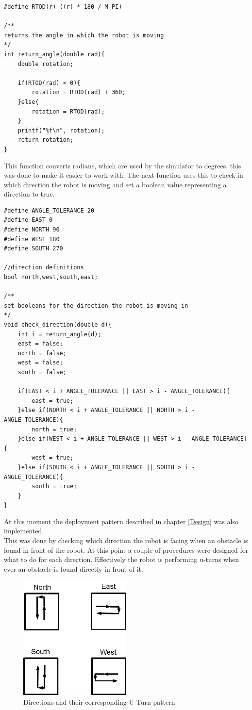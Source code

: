 \begin{flushleft}
\begin{lstlisting}[caption={Converting Radians to degrees}]
#define RTOD(r) ((r) * 180 / M_PI)

/**
returns the angle in which the robot is moving
*/
int return_angle(double rad){
	double rotation;

	if(RTOD(rad) < 0){
		rotation = RTOD(rad) + 360;
	}else{
		rotation = RTOD(rad);
	}
	printf("%f\n", rotation);
	return rotation;
}
\end{lstlisting}

This function converts radians, which are used by the simulator to degrees, this was done to make it easier to work with.
The next function uses this to check in which direction the robot is moving and set a boolean value representing a direction to true.

\begin{lstlisting}[caption={Early check of the movement direction}]
#define ANGLE_TOLERANCE 20
#define EAST 0
#define NORTH 90
#define WEST 180
#define SOUTH 270

//direction definitions
bool north,west,south,east;

/**
set booleans for the direction the robot is moving in
*/
void check_direction(double d){
	int i = return_angle(d);
	east = false;
	north = false;
	west = false;
	south = false;

	if(EAST < i + ANGLE_TOLERANCE || EAST > i - ANGLE_TOLERANCE){
		east = true;
	}else if(NORTH < i + ANGLE_TOLERANCE || NORTH > i - ANGLE_TOLERANCE){
		north = true;
	}else if(WEST < i + ANGLE_TOLERANCE || WEST > i - ANGLE_TOLERANCE){
		west = true;
	}else if(SOUTH < i + ANGLE_TOLERANCE || SOUTH > i - ANGLE_TOLERANCE){
		south = true;
	}
}
\end{lstlisting}

At this moment the deployment pattern described in chapter \ref{Design}  was also implemented. \\
This was done by checking which direction the robot is facing when an obstacle is found in front of the robot. At this point a couple of procedures were designed for what to do for each direction. Effectively the robot is performing u-turns when ever an obstacle is found directly in front of it. 

\begin{figure}[h]
\centering
\includegraphics[width = 0.5\textwidth]{../../figures/direction_uturn_pattern} 
\caption{Directions and their corresponding U-Turn pattern}
\label{directions_uturn_pattern}
\end{figure}


\end{flushleft}
